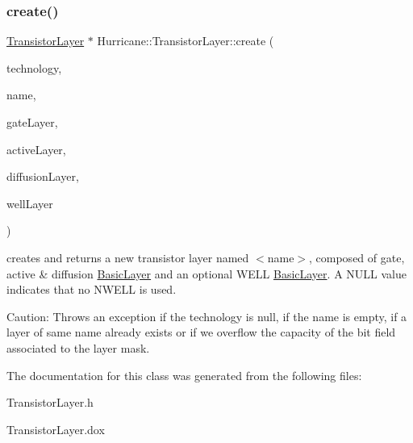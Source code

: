 \subsubsection{\texorpdfstring{create()}{create()}}
{\footnotesize\ttfamily \mbox{\hyperlink{classHurricane_1_1TransistorLayer}{Transistor\+Layer}} $\ast$ Hurricane\+::\+Transistor\+Layer\+::create (\begin{DoxyParamCaption}\item[{\mbox{\hyperlink{classHurricane_1_1Technology}{Technology}} $\ast$}]{technology,  }\item[{const \mbox{\hyperlink{classHurricane_1_1Name}{Name}} \&}]{name,  }\item[{\mbox{\hyperlink{classHurricane_1_1BasicLayer}{Basic\+Layer}} $\ast$}]{gate\+Layer,  }\item[{\mbox{\hyperlink{classHurricane_1_1BasicLayer}{Basic\+Layer}} $\ast$}]{active\+Layer,  }\item[{\mbox{\hyperlink{classHurricane_1_1BasicLayer}{Basic\+Layer}} $\ast$}]{diffusion\+Layer,  }\item[{\mbox{\hyperlink{classHurricane_1_1BasicLayer}{Basic\+Layer}} $\ast$}]{well\+Layer }\end{DoxyParamCaption})\hspace{0.3cm}{\ttfamily [static]}}

creates and returns a new transistor layer named {\ttfamily $<$name$>$}, composed of gate, active \& diffusion \mbox{\hyperlink{classHurricane_1_1BasicLayer}{Basic\+Layer}} and an optional W\+E\+LL \mbox{\hyperlink{classHurricane_1_1BasicLayer}{Basic\+Layer}}. A N\+U\+LL value indicates that no N\+W\+E\+LL is used.

\begin{DoxyParagraph}{Caution\+: Throws an exception if the technology is null, if the name is }
empty, if a layer of same name already exists or if we overflow the capacity of the bit field associated to the layer mask. 
\end{DoxyParagraph}


The documentation for this class was generated from the following files\+:\begin{DoxyCompactItemize}
\item 
Transistor\+Layer.\+h\item 
Transistor\+Layer.\+dox\end{DoxyCompactItemize}
